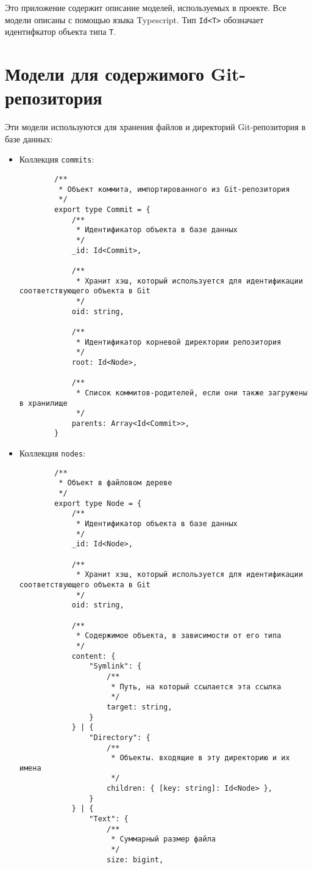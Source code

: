\label{addendum:models}

Это приложение содержит описание моделей, используемых в проекте. Все модели описаны с помощью языка Typescript. Тип \texttt{Id<T>} обозначает идентифкатор объекта типа \texttt{T}.

\section{Модели для содержимого Git-репозитория}

Эти модели используются для хранения файлов и директорий Git-репозитория в базе данных:

\begin{itemize}
    \item Коллекция \texttt{commits}:
        \begin{verbatim}
        /**
         * Объект коммита, импортированного из Git-репозитория
         */
        export type Commit = { 
            /**
             * Идентификатор объекта в базе данных
             */
            _id: Id<Commit>, 
            
            /**
             * Хранит хэш, который используется для идентификации соответствующего объекта в Git
             */
            oid: string, 
            
            /**
             * Идентификатор корневой директории репозитория
             */
            root: Id<Node>, 
            
            /**
             * Список коммитов-родителей, если они также загружены в хранилище
             */
            parents: Array<Id<Commit>>,
        }
        \end{verbatim}

    \item Коллекция \texttt{nodes}:
        \begin{verbatim}
        /**
         * Объект в файловом дереве
         */
        export type Node = {
            /**
             * Идентификатор объекта в базе данных
             */
            _id: Id<Node>,
            
            /**
             * Хранит хэш, который используется для идентификации соответствующего объекта в Git
             */
            oid: string,
            
            /**
             * Содержимое объекта, в зависимости от его типа
             */
            content: {
                "Symlink": {
                    /**
                     * Путь, на который ссылается эта ссылка
                     */
                    target: string,
                }
            } | {
                "Directory": {
                    /**
                     * Объекты. входящие в эту директорию и их имена
                     */
                    children: { [key: string]: Id<Node> },
                }
            } | {
                "Text": {
                    /**
                     * Суммарный размер файла
                     */
                    size: bigint,
                    

\end{verbatim}
\end{itemize}
